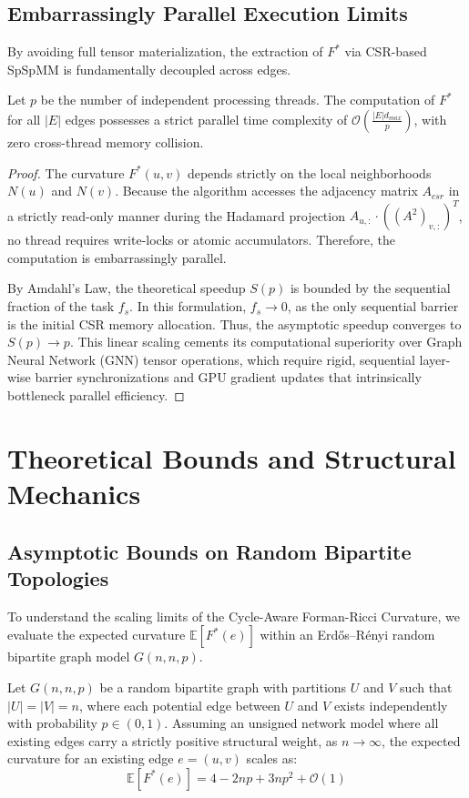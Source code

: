 \documentclass{siuro250211}
\begin{document}
\subsection{Embarrassingly Parallel Execution Limits}
By avoiding full tensor materialization, the extraction of $F^*$ via CSR-based SpSpMM is fundamentally decoupled across edges.

\begin{theorem}
Let $p$ be the number of independent processing threads. The computation of $F^*$ for all $|E|$ edges possesses a strict parallel time complexity of $\mathcal{O}\left(\frac{|E| d_{max}}{p}\right)$, with zero cross-thread memory collision.
\end{theorem}

\begin{proof}
The curvature $F^*(u,v)$ depends strictly on the local neighborhoods $N(u)$ and $N(v)$. Because the algorithm accesses the adjacency matrix $A_{csr}$ in a strictly read-only manner during the Hadamard projection $A_{u,:} \cdot ((A^2)_{v,:})^T$, no thread requires write-locks or atomic accumulators. Therefore, the computation is embarrassingly parallel. 

By Amdahl's Law, the theoretical speedup $S(p)$ is bounded by the sequential fraction of the task $f_s$. In this formulation, $f_s \to 0$, as the only sequential barrier is the initial CSR memory allocation. Thus, the asymptotic speedup converges to $S(p) \to p$. This linear scaling cements its computational superiority over Graph Neural Network (GNN) tensor operations, which require rigid, sequential layer-wise barrier synchronizations and GPU gradient updates that intrinsically bottleneck parallel efficiency.
\end{proof}

\section{Theoretical Bounds and Structural Mechanics}

\subsection{Asymptotic Bounds on Random Bipartite Topologies}
To understand the scaling limits of the Cycle-Aware Forman-Ricci Curvature, we evaluate the expected curvature $\mathbb{E}[F^*(e)]$ within an Erdős–Rényi random bipartite graph model $G(n, n, p)$.

\begin{theorem}
Let $G(n, n, p)$ be a random bipartite graph with partitions $U$ and $V$ such that $|U| = |V| = n$, where each potential edge between $U$ and $V$ exists independently with probability $p \in (0,1)$. Assuming an unsigned network model where all existing edges carry a strictly positive structural weight, as $n \to \infty$, the expected curvature for an existing edge $e=(u,v)$ scales as:
\begin{equation}
\mathbb{E}[F^*(e)] = 4 - 2np + 3np^2 + \mathcal{O}(1)
\end{equation}
\end{theorem}
\end{document}
